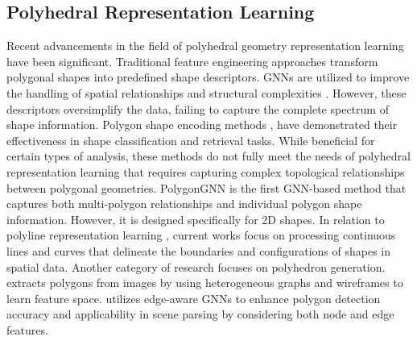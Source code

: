 \subsection{Polyhedral Representation Learning}
Recent advancements in the field of polyhedral geometry representation learning have been significant. Traditional feature engineering approaches \citep{pham2010fast, yan2019graph, he2018recognition}  transform polygonal shapes into predefined shape descriptors. GNNs are utilized to improve the handling of spatial relationships and structural complexities \citep{qi2017graph, shi2020pointgnn, wang2019dynamic}. However, these descriptors oversimplify the data, failing to capture the complete spectrum of shape information.  Polygon shape encoding methods \citep{van2019deep, mai2023towards, yan2021graph}, have demonstrated their effectiveness in shape classification and retrieval tasks. While beneficial for certain types of analysis, these methods do not fully meet the needs of polyhedral representation learning that requires capturing complex topological relationships between polygonal geometries. PolygonGNN \cite{yu2024polygongnn} is the first GNN-based method that captures both multi-polygon relationships and individual polygon shape information. However, it is designed specifically for 2D shapes. In relation to polyline representation learning \citep{jiang2021weakly, jiang2022weakly}, current works focus on processing continuous lines and curves that delineate the boundaries and configurations of shapes in spatial data.  Another category of research focuses on polyhedron generation. \citet{gillsjo2023polygon} extracts polygons from images by using heterogeneous graphs and wireframes to learn feature space. \citet{zorzi2023re} utilizes edge-aware GNNs to enhance polygon detection accuracy and applicability in scene parsing by considering both node and edge features. 

